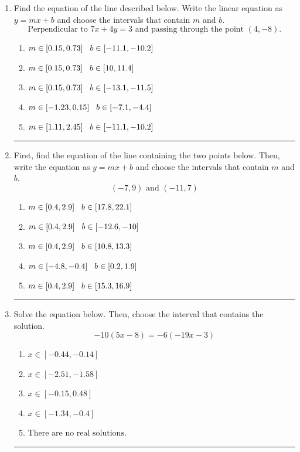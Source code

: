 \documentclass[14pt]{extbook}
\newcommand{\litem}[1]{\item#1\hspace*{-1cm}\rule{\textwidth}{0.4pt}}
\begin{document}
\begin{enumerate}
{\begin{enumerate}[label=\Alph*.]
\end{enumerate} }
\litem{
Find the equation of the line described below. Write the linear equation as $ y=mx+b $ and choose the intervals that contain $m$ and $b$.\[ \text{Perpendicular to } 7 x + 4 y = 3 \text{ and passing through the point } (4, -8). \]\begin{enumerate}[label=\Alph*.]
\item \( m \in [0.15, 0.73] \hspace*{3mm} b \in [-11.1, -10.2] \)
\item \( m \in [0.15, 0.73] \hspace*{3mm} b \in [10, 11.4] \)
\item \( m \in [0.15, 0.73] \hspace*{3mm} b \in [-13.1, -11.5] \)
\item \( m \in [-1.23, 0.15] \hspace*{3mm} b \in [-7.1, -4.4] \)
\item \( m \in [1.11, 2.45] \hspace*{3mm} b \in [-11.1, -10.2] \)

\end{enumerate} }
\litem{
First, find the equation of the line containing the two points below. Then, write the equation as $ y=mx+b $ and choose the intervals that contain $m$ and $b$.\[ (-7, 9) \text{ and } (-11, 7) \]\begin{enumerate}[label=\Alph*.]
\item \( m \in [0.4, 2.9] \hspace*{3mm} b \in [17.8, 22.1] \)
\item \( m \in [0.4, 2.9] \hspace*{3mm} b \in [-12.6, -10] \)
\item \( m \in [0.4, 2.9] \hspace*{3mm} b \in [10.8, 13.3] \)
\item \( m \in [-4.8, -0.4] \hspace*{3mm} b \in [0.2, 1.9] \)
\item \( m \in [0.4, 2.9] \hspace*{3mm} b \in [15.3, 16.9] \)

\end{enumerate} }

\litem{
Solve the equation below. Then, choose the interval that contains the solution.\[ -10(5x -8) = -6(-19x -3) \]\begin{enumerate}[label=\Alph*.]
\item \( x \in [-0.44, -0.14] \)
\item \( x \in [-2.51, -1.58] \)
\item \( x \in [-0.15, 0.48] \)
\item \( x \in [-1.34, -0.4] \)
\item \( \text{There are no real solutions.} \)


\end{enumerate}}
\end{enumerate}
\end{document}
